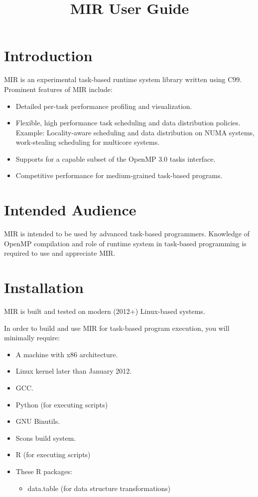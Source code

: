 \documentclass[11pt,a4paper]{article}
\title{MIR User Guide}
\begin{document}
\maketitle

\section{Introduction}\label{introduction}

MIR is an experimental task-based runtime system library written using C99. Prominent features of MIR include:
\begin{itemize}
    \item Detailed per-task performance profiling and visualization.
    \item Flexible, high performance task scheduling and data distribution policies. Example: Locality-aware scheduling and data distribution on NUMA systems, work-stealing scheduling for multicore systems.
    \item Supports for a capable subset of the OpenMP 3.0 tasks interface.
    \item Competitive performance for medium-grained task-based programs.
\end{itemize}

\section{Intended Audience}\label{intended-audience}

MIR is intended to be used by advanced task-based programmers. Knowledge of OpenMP compilation and role of runtime system in task-based programming is required to use and appreciate MIR.

\section{Installation}\label{installation}

MIR is built and tested on modern (2012+) Linux-based systems. 

In order to build and use MIR for task-based program execution, you will minimally require:

\begin{itemize}
  \item A machine with x86 architecture.
  \item Linux kernel later than January 2012.
  \item GCC.
  \item Python (for executing scripts)
  \item GNU Binutils.
  \item Scons build system.
  \item R (for executing scripts)
  \item These R packages:
  \begin{itemize}
      \item data.table (for data structure transformations)
  \end{itemize}
\end{itemize}
\end{document}
